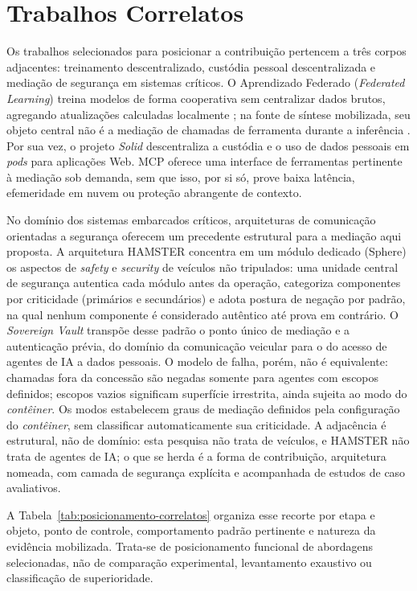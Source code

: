 \documentclass[12pt,openright,twoside,a4paper,english,brazil]{abntex2}
\begin{document}
\section{Trabalhos Correlatos}
Os trabalhos selecionados para posicionar a contribuição pertencem a três corpos adjacentes: treinamento descentralizado, custódia pessoal descentralizada e mediação de segurança em sistemas críticos. O Aprendizado Federado (\textit{Federated Learning}) treina modelos de forma cooperativa sem centralizar dados brutos, agregando atualizações calculadas localmente \cite{mcmahan2017,mammen2021}; na fonte de síntese mobilizada, seu objeto central não é a mediação de chamadas de ferramenta durante a inferência \cite{mammen2021}. Por sua vez, o projeto \textit{Solid} \cite{sambra2016} descentraliza a custódia e o uso de dados pessoais em \textit{pods} para aplicações Web. MCP oferece uma interface de ferramentas pertinente à mediação sob demanda, sem que isso, por si só, prove baixa latência, efemeridade em nuvem ou proteção abrangente de contexto.

No domínio dos sistemas embarcados críticos, arquiteturas de comunicação orientadas a segurança oferecem um precedente estrutural para a mediação aqui proposta. A arquitetura HAMSTER \cite{pigatto2016} concentra em um módulo dedicado (Sphere) os aspectos de \textit{safety} e \textit{security} de veículos não tripulados: uma unidade central de segurança autentica cada módulo antes da operação, categoriza componentes por criticidade (primários e secundários) e adota postura de negação por padrão, na qual nenhum componente é considerado autêntico até prova em contrário. O \textit{Sovereign Vault} transpõe desse padrão o ponto único de mediação e a autenticação prévia, do domínio da comunicação veicular para o do acesso de agentes de IA a dados pessoais. O modelo de falha, porém, não é equivalente: chamadas fora da concessão são negadas somente para agentes com escopos definidos; escopos vazios significam superfície irrestrita, ainda sujeita ao modo do \textit{contêiner}. Os modos estabelecem graus de mediação definidos pela configuração do \textit{contêiner}, sem classificar automaticamente sua criticidade. A adjacência é estrutural, não de domínio: esta pesquisa não trata de veículos, e HAMSTER não trata de agentes de IA; o que se herda é a forma de contribuição, arquitetura nomeada, com camada de segurança explícita e acompanhada de estudos de caso avaliativos.

A Tabela~\ref{tab:posicionamento-correlatos} organiza esse recorte por etapa e objeto, ponto de controle, comportamento padrão pertinente e natureza da evidência mobilizada. Trata-se de posicionamento funcional de abordagens selecionadas, não de comparação experimental, levantamento exaustivo ou classificação de superioridade.
\end{document}
